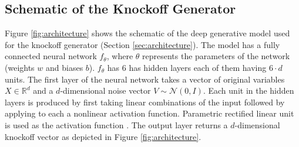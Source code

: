 \documentclass{article}
\theoremstyle{definition}
\begin{document}
\subsection{Schematic of the Knockoff Generator}\label{supp:knockoff_generation}
 Figure \ref{fig:architecture} shows the schematic of the deep generative model used for the knockoff generator (Section \ref{sec:architecture}). The model has a fully connected neural network $f_\theta$, where $\theta$ represents the parameters of the network (weights $w$ and biases $b$). $f_\theta$ has $6$ has hidden layers each of them having $6\cdot d$ units. The first layer of the neural network takes a vector of original variables $X\in \mathbb R^d$ and a $d$-dimensional noise vector $V\sim \mathcal N(0, I)$. Each unit in the hidden layers is produced by first taking linear combinations of the input followed by applying to each a nonlinear activation function. Parametric rectified linear unit is used as the activation function \cite{xu2015empirical}. The output layer returns a $d$-dimensional knockoff vector as depicted in Figure \ref{fig:architecture}.
\end{document}
